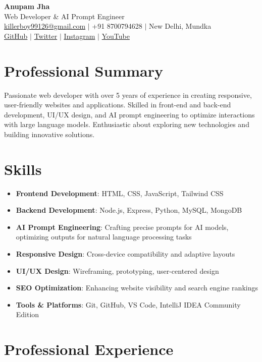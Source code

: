\documentclass[a4paper,10pt]{article}
\begin{document}
\begin{center}
    {\Huge\bfseries Anupam Jha} \\[0.2cm]
    Web Developer \& AI Prompt Engineer \\[0.1cm]
    \href{mailto:killerboy99126@gmail.com}{killerboy99126@gmail.com} $|$ +91 8700794628 $|$ New Delhi, Mundka \\[0.1cm]
    \href{https://github.com/AkaTriggered}{GitHub} $|$ \href{https://x.com/AkaTriggered}{Twitter} $|$ \href{https://instagram.com/anupamnotfound}{Instagram} $|$ \href{https://youtube.com/@AkaTriggered}{YouTube}
\end{center}

\section*{Professional Summary}
Passionate web developer with over 5 years of experience in creating responsive, user-friendly websites and applications. Skilled in front-end and back-end development, UI/UX design, and AI prompt engineering to optimize interactions with large language models. Enthusiastic about exploring new technologies and building innovative solutions.

\section*{Skills}
\begin{itemize}[leftmargin=*,itemsep=2pt]
    \item \textbf{Frontend Development}: HTML, CSS, JavaScript, Tailwind CSS
    \item \textbf{Backend Development}: Node.js, Express, Python, MySQL, MongoDB
    \item \textbf{AI Prompt Engineering}: Crafting precise prompts for AI models, optimizing outputs for natural language processing tasks
    \item \textbf{Responsive Design}: Cross-device compatibility and adaptive layouts
    \item \textbf{UI/UX Design}: Wireframing, prototyping, user-centered design
    \item \textbf{SEO Optimization}: Enhancing website visibility and search engine rankings
    \item \textbf{Tools \& Platforms}: Git, GitHub, VS Code, IntelliJ IDEA Community Edition
\end{itemize}

\section*{Professional Experience}
\end{document}
